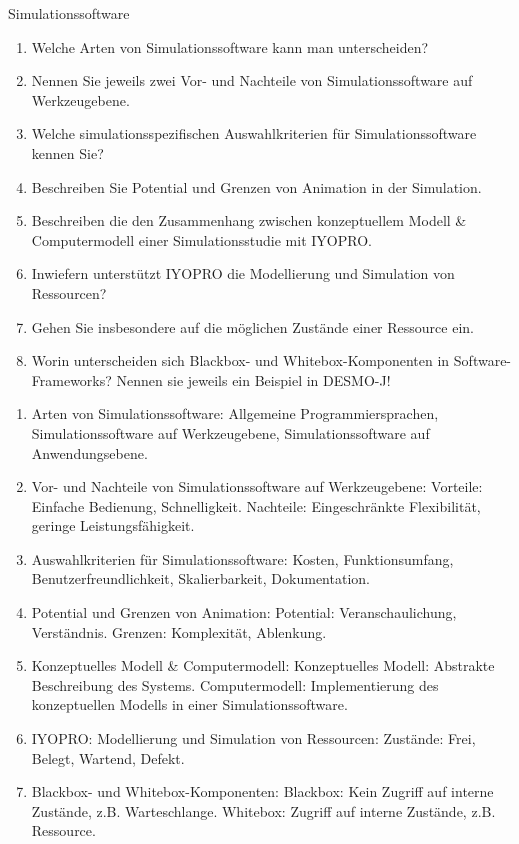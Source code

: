 \documentclass{article}
\begin{document}
\begin{exercise}{Simulationssoftware}
  \begin{enumerate}
    \item Welche Arten von Simulationssoftware kann man unterscheiden?
    \item Nennen Sie jeweils zwei Vor- und Nachteile von Simulationssoftware auf Werkzeugebene.
    \item Welche simulationsspezifischen Auswahlkriterien für Simulationssoftware kennen Sie?
    \item Beschreiben Sie Potential und Grenzen von Animation in der Simulation.
    \item Beschreiben die den Zusammenhang zwischen konzeptuellem Modell \& Computermodell einer Simulationsstudie mit IYOPRO.
    \item Inwiefern unterstützt IYOPRO die Modellierung und Simulation von Ressourcen?
    \item Gehen Sie insbesondere auf die möglichen Zustände einer Ressource ein.
    \item Worin unterscheiden sich Blackbox- und Whitebox-Komponenten in Software-Frameworks? Nennen sie jeweils ein Beispiel in DESMO-J!
  \end{enumerate}

  \begin{solution}
    \begin{enumerate}
      \item Arten von Simulationssoftware: Allgemeine Programmiersprachen, Simulationssoftware auf Werkzeugebene, Simulationssoftware auf Anwendungsebene.
      \item Vor- und Nachteile von Simulationssoftware auf Werkzeugebene: Vorteile: Einfache Bedienung, Schnelligkeit. Nachteile: Eingeschränkte Flexibilität, geringe Leistungsfähigkeit.
      \item Auswahlkriterien für Simulationssoftware: Kosten, Funktionsumfang, Benutzerfreundlichkeit, Skalierbarkeit, Dokumentation.
      \item Potential und Grenzen von Animation: Potential: Veranschaulichung, Verständnis. Grenzen: Komplexität, Ablenkung.
      \item Konzeptuelles Modell \& Computermodell: Konzeptuelles Modell: Abstrakte Beschreibung des Systems. Computermodell: Implementierung des konzeptuellen Modells in einer Simulationssoftware.
      \item IYOPRO: Modellierung und Simulation von Ressourcen: Zustände: Frei, Belegt, Wartend, Defekt.
      \item Blackbox- und Whitebox-Komponenten: Blackbox: Kein Zugriff auf interne Zustände, z.B. Warteschlange. Whitebox: Zugriff auf interne Zustände, z.B. Ressource.
    \end{enumerate}
  \end{solution}
\end{exercise}
\end{document}
